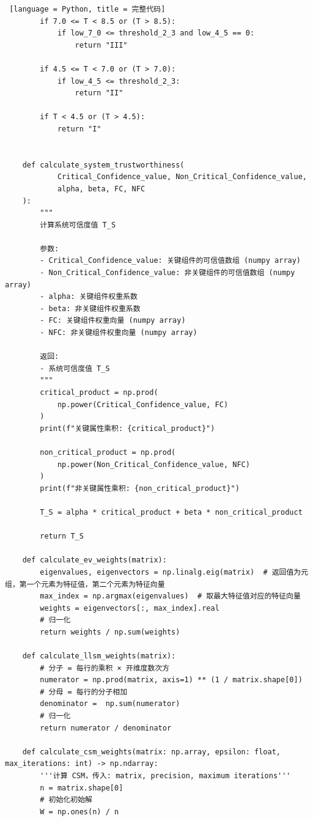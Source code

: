 \documentclass[14pt,a4paper,UTF8,twoside]{article}
\begin{document}
\begin{lstlisting} [language = Python, title = 完整代码]
        if 7.0 <= T < 8.5 or (T > 8.5):
            if low_7_0 <= threshold_2_3 and low_4_5 == 0:
                return "III"
    
        if 4.5 <= T < 7.0 or (T > 7.0):
            if low_4_5 <= threshold_2_3:
                return "II"
    
        if T < 4.5 or (T > 4.5):
            return "I"
    
    
    def calculate_system_trustworthiness(
            Critical_Confidence_value, Non_Critical_Confidence_value,
            alpha, beta, FC, NFC
    ):
        """
        计算系统可信度值 T_S
    
        参数:
        - Critical_Confidence_value: 关键组件的可信值数组 (numpy array)
        - Non_Critical_Confidence_value: 非关键组件的可信值数组 (numpy array)
        - alpha: 关键组件权重系数
        - beta: 非关键组件权重系数
        - FC: 关键组件权重向量 (numpy array)
        - NFC: 非关键组件权重向量 (numpy array)
    
        返回:
        - 系统可信度值 T_S
        """
        critical_product = np.prod(
            np.power(Critical_Confidence_value, FC)
        )
        print(f"关键属性乘积: {critical_product}")
    
        non_critical_product = np.prod(
            np.power(Non_Critical_Confidence_value, NFC)
        )
        print(f"非关键属性乘积: {non_critical_product}")
    
        T_S = alpha * critical_product + beta * non_critical_product
    
        return T_S
    
    def calculate_ev_weights(matrix):
        eigenvalues, eigenvectors = np.linalg.eig(matrix)  # 返回值为元组，第一个元素为特征值，第二个元素为特征向量
        max_index = np.argmax(eigenvalues)  # 取最大特征值对应的特征向量
        weights = eigenvectors[:, max_index].real
        # 归一化
        return weights / np.sum(weights)
    
    def calculate_llsm_weights(matrix):
        # 分子 = 每行的乘积 × 开维度数次方
        numerator = np.prod(matrix, axis=1) ** (1 / matrix.shape[0])
        # 分母 = 每行的分子相加
        denominator =  np.sum(numerator)
        # 归一化
        return numerator / denominator
    
    def calculate_csm_weights(matrix: np.array, epsilon: float, max_iterations: int) -> np.ndarray:
        '''计算 CSM，传入: matrix, precision, maximum iterations'''
        n = matrix.shape[0]
        # 初始化初始解
        W = np.ones(n) / n
    

\end{lstlisting}
\end{document}
